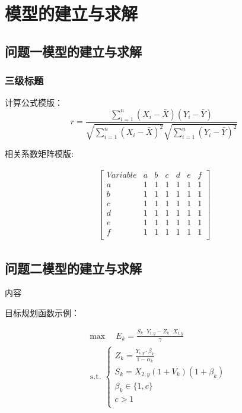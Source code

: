 \documentclass[a4paper]{article}
\begin{document}
	
	\section{模型的建立与求解}
	\subsection{问题一模型的建立与求解}
	\subsubsection{三级标题}
	
	计算公式模版：
	\begin{equation}
		r=\frac{\sum_{i=1}^n\left(X_i-\bar{X}\right)\left(Y_i-\bar{Y}\right)}{\sqrt{\sum_{i=1}^n\left(X_i-\bar{X}\right)^2} \sqrt{\sum_{i=1}^n\left(Y_i-\bar{Y}\right)^2}}
	\end{equation}
	
	相关系数矩阵模版:
	
	\begin{gather*}
		\begin{bmatrix}
			Variable & a & b & c & d & e & f \\
			a & 1 & 1 & 1 & 1 & 1 & 1 \\
			b & 1 & 1 & 1 & 1 & 1 & 1 \\
			c & 1 & 1 & 1 & 1 & 1 & 1 \\
			d & 1 & 1 & 1 & 1 & 1 & 1 \\
			e & 1 & 1 & 1 & 1 & 1 & 1 \\
			f & 1 & 1 & 1 & 1 & 1 & 1 \\
		\end{bmatrix}
	\end{gather*}
	
	
	\subsection{问题二模型的建立与求解}
	
	内容
	
	目标规划函数示例：
	
	\begin{equation}
		\begin{aligned}
			& \max \quad E_k=\frac{S_k \cdot Y_{i, y}-Z_k \cdot X_{i, y}}{\gamma} \\
			& \text { s.t. }\left\{\begin{array}{l}
				Z_k=\frac{Y_{i, y} \cdot \beta_k}{1-\alpha_k} \\
				S_k=X_{2, y}\left(1+V_k\right)\left(1+\beta_k\right) \\
				\beta_k \in\{1, c\} \\
				c>1 \\
				
			\end{array}\right.
		\end{aligned}
	\end{equation}
	
\end{document}
